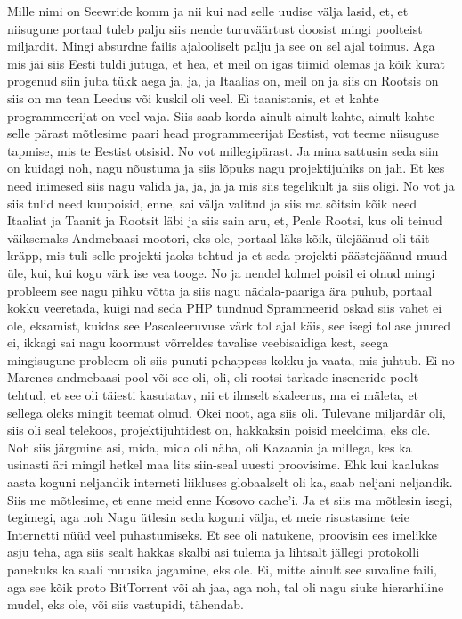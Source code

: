Mille nimi on Seewride komm ja nii kui nad selle uudise välja lasid, et, et niisugune portaal tuleb palju siis nende turuväärtust doosist mingi poolteist miljardit. Mingi absurdne failis ajalooliselt palju ja see on sel ajal toimus. Aga mis jäi siis Eesti tuldi jutuga, et hea, et meil on igas tiimid olemas ja kõik kurat progenud siin juba tükk aega ja, ja, ja Itaalias on, meil on ja siis on Rootsis on siis on ma tean Leedus või kuskil oli veel. Ei taanistanis, et et kahte programmeerijat on veel vaja. Siis saab korda ainult ainult kahte, ainult kahte selle pärast mõtlesime paari head programmeerijat Eestist, vot teeme niisuguse tapmise, mis te Eestist otsisid. No vot millegipärast. Ja mina sattusin seda siin on kuidagi noh, nagu nõustuma ja siis lõpuks nagu projektijuhiks on jah. Et kes need inimesed siis nagu valida ja, ja, ja ja mis siis tegelikult ja siis oligi. No vot ja siis tulid need kuupoisid, enne, sai välja valitud ja siis ma sõitsin kõik need Itaaliat ja Taanit ja Rootsit läbi ja siis sain aru, et,
Peale Rootsi, kus oli teinud väiksemaks
Andmebaasi mootori, eks ole, portaal läks kõik, ülejäänud oli täit kräpp, mis tuli selle projekti jaoks tehtud ja et seda projekti päästejäänud muud üle, kui, kui kogu värk ise vea tooge. No ja nendel kolmel poisil ei olnud mingi probleem see nagu pihku võtta ja siis nagu nädala-paariga ära puhub, portaal kokku veeretada, kuigi nad seda PHP tundnud Sprammeerid oskad siis vahet ei ole, eksamist, kuidas see Pascaleeruvuse värk tol ajal käis, see isegi tollase juured ei, ikkagi sai nagu koormust võrreldes tavalise veebisaidiga kest, seega mingisugune probleem oli siis punuti pehappess kokku ja vaata, mis juhtub. Ei no Marenes andmebaasi pool või see oli, oli, oli rootsi tarkade inseneride poolt tehtud, et see oli täiesti kasutatav, nii et ilmselt skaleerus, ma ei mäleta, et sellega oleks mingit teemat olnud. Okei noot, aga siis oli.
Tulevane miljardär oli, siis oli seal telekoos, projektijuhtidest on, hakkaksin poisid meeldima, eks ole. Noh siis järgmine asi, mida, mida oli näha, oli Kazaania ja millega, kes ka usinasti äri mingil hetkel maa lits siin-seal uuesti proovisime. Ehk kui kaalukas aasta koguni neljandik interneti liikluses globaalselt oli ka, saab neljani neljandik. Siis me mõtlesime, et enne meid enne Kosovo cache'i. Ja et siis ma mõtlesin isegi, tegimegi, aga noh
Nagu ütlesin seda koguni välja, et meie risustasime teie Internetti nüüd veel puhastumiseks.
Et see oli natukene, proovisin ees imelikke asju teha, aga siis sealt hakkas skalbi asi tulema ja lihtsalt jällegi protokolli panekuks ka saali muusika jagamine, eks ole. Ei, mitte ainult see suvaline faili, aga see kõik proto BitTorrent või ah jaa, aga noh, tal oli nagu siuke hierarhiline mudel, eks ole, või siis vastupidi, tähendab.
